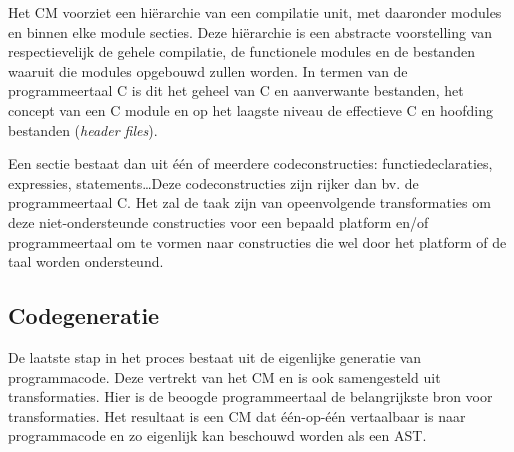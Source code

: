 Het CM voorziet een hi\"erarchie van een compilatie unit, met daaronder modules
en binnen elke module secties. Deze hi\"erarchie is een abstracte voorstelling
van respectievelijk de gehele compilatie, de functionele modules en de
bestanden waaruit die modules opgebouwd zullen worden. In termen van de
programmeertaal C is dit het geheel van C en aanverwante bestanden, het concept
van een C module en op het laagste niveau de effectieve C en hoofding bestanden
(\emph{header files}).

Een sectie bestaat dan uit \'e\'en of meerdere codeconstructies:
functiedeclaraties, expressies, statements\dots Deze codeconstructies zijn
rijker dan bv. de programmeertaal C. Het zal de taak zijn van opeenvolgende
transformaties om deze niet-ondersteunde constructies voor een bepaald platform
en/of programmeertaal om te vormen naar constructies die wel door het platform
of de taal worden ondersteund.

\subsection{Codegeneratie}

De laatste stap in het proces bestaat uit de eigenlijke generatie van
programmacode. Deze vertrekt van het CM en is ook samengesteld uit
transformaties. Hier is de beoogde programmeertaal de belangrijkste bron voor
transformaties. Het resultaat is een CM dat \'e\'en-op-\'e\'en vertaalbaar is
naar programmacode en zo eigenlijk kan beschouwd worden als een AST.
